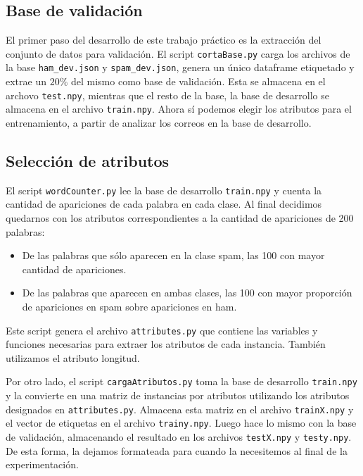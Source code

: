 \documentclass[10pt, a4paper]{article}
\begin{document}
\subsection{Base de validación}

El primer paso del desarrollo de este trabajo práctico es la extracción del conjunto de datos para validación. El script \texttt{cortaBase.py} carga los archivos de la base \texttt{ham\_dev.json} y \texttt{spam\_dev.json}, genera un único dataframe etiquetado y extrae un $20\%$ del mismo como base de validación. Esta se almacena en el archovo \texttt{test.npy}, mientras que el resto de la base, la base de desarrollo se almacena en el archivo \texttt{train.npy}. Ahora sí podemos elegir los atributos para el entrenamiento, a partir de analizar los correos en la base de desarrollo.

\subsection{Selección de atributos}

El script \texttt{wordCounter.py} lee la base de desarrollo \texttt{train.npy} y cuenta la cantidad de apariciones de cada palabra en cada clase. Al final decidimos quedarnos con los atributos correspondientes a la cantidad de apariciones de 200 palabras:

\begin{itemize}
\item De las palabras que sólo aparecen en la clase spam, las 100 con mayor cantidad de apariciones.
\item De las palabras que aparecen en ambas clases, las 100 con mayor proporción de apariciones en spam sobre apariciones en ham.
\end{itemize}

Este script genera el archivo \texttt{attributes.py} que contiene las variables y funciones necesarias para extraer los atributos de cada instancia. También utilizamos el atributo longitud.

Por otro lado, el script \texttt{cargaAtributos.py} toma la base de desarrollo \texttt{train.npy} y la convierte en una matriz de instancias por atributos utilizando los atributos designados en \texttt{attributes.py}. Almacena esta matriz en el archivo \texttt{trainX.npy} y el vector de etiquetas en el archivo \texttt{trainy.npy}. Luego hace lo mismo con la base de validación, almacenando el resultado en los archivos \texttt{testX.npy} y \texttt{testy.npy}. De esta forma, la dejamos formateada para cuando la necesitemos al final de la experimentación.
\end{document}
